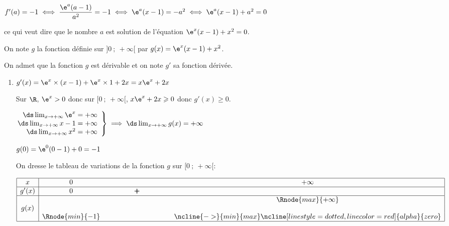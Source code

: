\begin{enumerate}
\begin{enumerate}
$f'(a)=-1 \iff \dfrac{\e^{a} (a-1)}{a^2}=-1 \iff \e^{a} (x-1) = -a^2 \iff \e^{a}(x-1)+a^2=0$

ce qui veut dire que le nombre $a$ est solution de l'équation $\e^x(x - 1) + x^2  = 0$.
			\end{enumerate}
		
On note $g$ la fonction définie sur $]0~;~ +\infty[$ par $g(x) = \e^x(x - 1) + x^2 $.

On admet que la fonction $g$ est dérivable et on note $g'$ sa fonction dérivée.

\begin{enumerate}[resume]
		\item %
$g'(x)= \e^{x}\times (x-1) + \e^{x}\times 1 + 2x = x\e^{x}+2x$

Sur $\R$, $\e^{x}>0$ donc sur $[0~;~+\infty[$, $x\e^{x}+2x \geqslant 0$ donc $g'(x)\geqslant 0$.

$\left.
\begin{array}{@{} r}
\ds\lim_{x\to +\infty} \e^{x} = +\infty\\
\ds\lim_{x\to +\infty} x-1= +\infty\\
\ds\lim_{x\to +\infty} x^2 = +\infty
\end{array}
\right \rbrace
\implies
\ds\lim_{x\to +\infty} g(x) = +\infty$

$g(0)=\e^{0}(0-1)+0=-1$

On dresse le tableau de variations de la fonction $g$ sur $[0~;~+\infty[$:

\begin{center}
{\renewcommand{\arraystretch}{1.3}
\def\esp{\hspace*{3cm}}
\def\hauteur{0pt}
$\begin{array}{|c| *3{c}|}
\hline
 x & 0   & \esp & +\infty \\
 \hline
g'(x) & 0   & \pmb{+} & \\  
\hline
  &   &    & \Rnode{max}{+\infty}   \\
g(x) & &  &  \rule{0pt}{\hauteur} \\
 &     \Rnode{min}{-1} & & \rule{0pt}{\hauteur}
\ncline{->}{min}{max}
\ncline[linestyle=dotted, linecolor=red]{alpha}{zero}\\
\hline
\end{array}$
}
\end{center}


\end{enumerate}
\end{enumerate}
